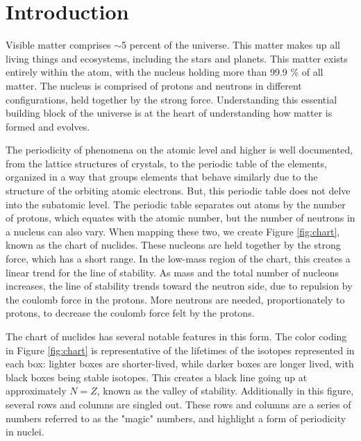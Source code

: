 %
%

\chapter{Introduction}

Visible matter comprises $\sim$5 percent of the universe. This matter makes up all living things and ecosystems, including the stars and planets. This matter exists entirely within the atom, with the nucleus holding more than 99.9 \% of all matter. The nucleus is comprised of protons and neutrons in different configurations, held together by the strong force. Understanding this essential building block of the universe is at the heart of understanding how matter is formed and evolves.

The periodicity of phenomena on the atomic level and higher is well documented, from the lattice structures of crystals, to the periodic table of the elements, organized in a way that groups elements that behave similarly due to the structure of the orbiting atomic electrons. But, this periodic table does not delve into the subatomic level. The periodic table separates out atoms by the number of protons, which equates with the atomic number, but the number of neutrons in a nucleus can also vary. When mapping these two, we create Figure \ref{fig:chart}, known as the chart of nuclides. These nucleons are held together by the strong force, which has a short range. In the low-mass region of the chart, this creates a linear trend for the line of stability. As mass and the total number of nucleons increases, the line of stability trends toward the neutron side, due to repulsion by the coulomb force in the protons. More neutrons are needed, proportionately to protons, to decrease the coulomb force felt by the protons.



The chart of nuclides has several notable features in this form. The color coding in Figure \ref{fig:chart} is representative of the lifetimes of the isotopes represented in each box: lighter boxes are shorter-lived, while darker boxes are longer lived, with black boxes being stable isotopes. This creates a black line going up at approximately $N=Z$, known as the valley of stability. Additionally in this figure, several rows and columns are singled out. These rows and columns are a series of numbers referred to as the "magic" numbers, and highlight a form of periodicity in nuclei. 

